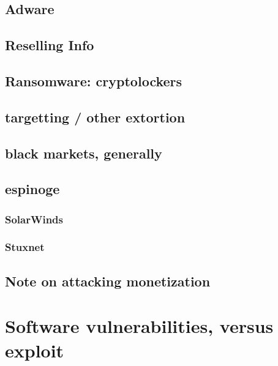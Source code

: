 \subsection{Adware}


\subsection{Reselling Info}


\subsection{Ransomware: cryptolockers}


\subsection{targetting / other extortion}


\subsection{black markets, generally}


\subsection{espinoge}


\subsubsection{SolarWinds}


\subsubsection{Stuxnet}


\subsection{Note on attacking monetization}


\section{Software vulnerabilities, versus exploit}


